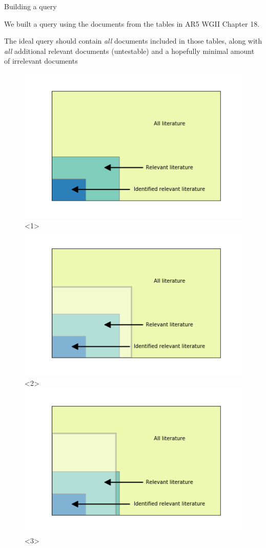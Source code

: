 \documentclass[9pt]{beamer}
\begin{document}
\begin{frame}
\tableofcontents[currentsection]
\end{frame}

\begin{frame}{Building a query}

We built a query using the documents from the tables in AR5 WGII Chapter 18.

The ideal query should contain \textit{all} documents included in those tables, along with \textit{all} additional relevant documents (untestable) and a hopefully minimal amount of irrelevant documents

\begin{figure}
	\includegraphics[width=0.7\linewidth]{../plots/basic_lit_plot.png}<1>
	\includegraphics[width=0.7\linewidth]{../plots/lit_plot_query_1.png}<2>
	\includegraphics[width=0.7\linewidth]{../plots/lit_plot_query_3.png}<3>

\end{figure}
\end{frame}
\end{document}
